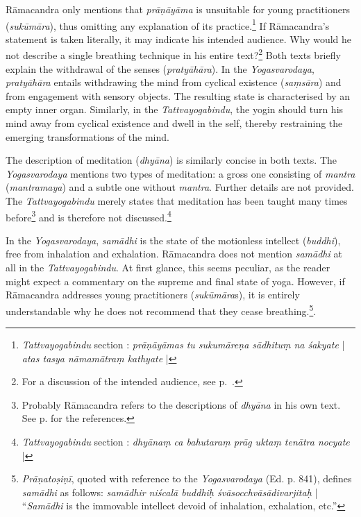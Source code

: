 Rāmacandra only mentions that \textit{prāṇāyāma} is unsuitable for young practitioners (\textit{sukūmāra}), thus omitting any explanation of its practice.\footnote{\textit{Tattvayogabindu} section : \textit{prāṇāyāmas tu sukumāreṇa sādhituṃ na śakyate} | \textit{atas tasya nāmamātraṃ kathyate} |} If Rāmacandra's statement is taken literally, it may indicate his intended audience. Why would he not describe a single breathing technique in his entire text?\footnote{For a discussion of the intended audience, see p.~\pageref{tyb-audience}.}
Both texts briefly explain the withdrawal of the senses (\textit{pratyāhāra}). In the \textit{Yogasvarodaya}, \textit{pratyāhāra} entails withdrawing the mind from cyclical existence (\textit{saṃsāra}) and from engagement with sensory objects. The resulting state is characterised by an empty inner organ. Similarly, in the \textit{Tattvayogabindu}, the yogin should turn his mind away from cyclical existence and dwell in the self, thereby restraining the emerging transformations of the mind.

The description of meditation (\textit{dhyāna}) is similarly concise in both texts. The \textit{Yogasvarodaya} mentions two types of meditation: a gross one consisting of \textit{mantra} (\textit{mantramaya}) and a subtle one without \textit{mantra}. Further details are not provided. The \textit{Tattvayogabindu} merely states that meditation has been taught many times before\footnote{Probably Rāmacandra refers to the descriptions of \emph{dhyāna} in his own text. See p. \pageref{ramacandradhyana} for the references.} and is therefore not discussed.\footnote{\textit{Tattvayogabindu} section : \textit{dhyānaṃ ca bahutaraṃ prāg uktaṃ tenātra nocyate} |}

In the \textit{Yogasvarodaya}, \textit{samādhi} is the state of the motionless intellect (\textit{buddhi}), free from inhalation and exhalation. Rāmacandra does not mention \textit{samādhi} at all in the \textit{Tattvayogabindu}. At first glance, this seems peculiar, as the reader might expect a commentary on the supreme and final state of yoga. However, if Rāmacandra addresses young practitioners (\textit{sukūmāra}s), it is entirely understandable why he does not recommend that they cease breathing.\footnote{\emph{Prāṇatoṣiṇī}, quoted with reference to the \textit{Yogasvarodaya} (Ed. p. 841), defines \textit{samādhi} as follows: \textit{samādhir niścalā buddhiḥ śvāsocchvāsādivarjitaḥ} | ``\textit{Samādhi} is the immovable intellect devoid of inhalation, exhalation, etc.''}.

